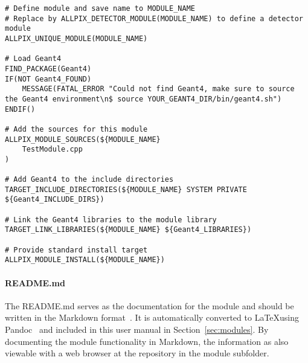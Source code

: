 \begin{verbatim}
# Define module and save name to MODULE_NAME
# Replace by ALLPIX_DETECTOR_MODULE(MODULE_NAME) to define a detector module
ALLPIX_UNIQUE_MODULE(MODULE_NAME)

# Load Geant4
FIND_PACKAGE(Geant4)
IF(NOT Geant4_FOUND)
    MESSAGE(FATAL_ERROR "Could not find Geant4, make sure to source the Geant4 environment\n$ source YOUR_GEANT4_DIR/bin/geant4.sh")
ENDIF()

# Add the sources for this module
ALLPIX_MODULE_SOURCES(${MODULE_NAME}
    TestModule.cpp
)

# Add Geant4 to the include directories
TARGET_INCLUDE_DIRECTORIES(${MODULE_NAME} SYSTEM PRIVATE ${Geant4_INCLUDE_DIRS})

# Link the Geant4 libraries to the module library
TARGET_LINK_LIBRARIES(${MODULE_NAME} ${Geant4_LIBRARIES})

# Provide standard install target
ALLPIX_MODULE_INSTALL(${MODULE_NAME})
\end{verbatim}

\paragraph{README.md}
The README.md serves as the documentation for the module and should be written in the Markdown format~\cite{markdown}.
It is automatically converted to \LaTeX using Pandoc~\cite{pandoc} and included in this user manual in Section~\ref{sec:modules}.
By documenting the module functionality in Markdown, the information as also viewable with a web browser at the repository in the module subfolder.

